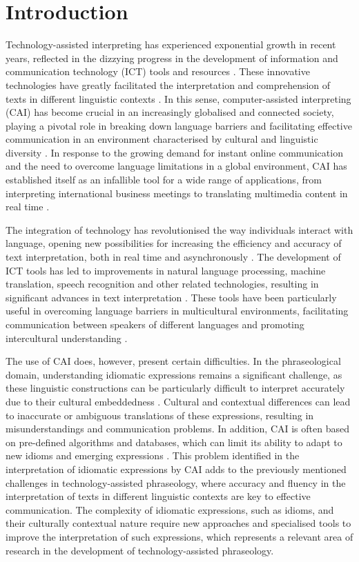 \section{Introduction}\label{sec-intro}

Technology-assisted interpreting has experienced exponential growth in
recent years, reflected in the dizzying progress in the development of
information and communication technology (ICT) tools and resources
\cite{gutierrezArtacho2016,mezcua2019}. These innovative
technologies have greatly facilitated the interpretation and
comprehension of texts in different linguistic contexts \cite{olallaSoler2015}. In this sense, computer-assisted interpreting (CAI)
has become crucial in an increasingly globalised and connected society,
playing a pivotal role in breaking down language barriers and
facilitating effective communication in an environment characterised by
cultural and linguistic diversity \cite{mellinger2019,li2021}. In
response to the growing demand for instant online communication and the
need to overcome language limitations in a global environment, CAI has
established itself as an infallible tool for a wide range of
applications, from interpreting international business meetings to
translating multimedia content in real time \cite{fantinuoli2017a,alcaidemartinez2021}.

The integration of technology has revolutionised the way individuals
interact with language, opening new possibilities for increasing the
efficiency and accuracy of text interpretation, both in real time and
asynchronously \cite{gaber2023a,ramirezRodriguez2023}. The development
of ICT tools has led to improvements in natural language processing,
machine translation, speech recognition and other related technologies,
resulting in significant advances in text interpretation \cite{valeroGarces2024}. These tools have been particularly useful in overcoming language
barriers in multicultural environments, facilitating communication
between speakers of different languages and promoting intercultural
understanding \cite{perez2020}.

The use of CAI does, however, present certain difficulties. In the
phraseological domain, understanding idiomatic expressions remains a
significant challenge, as these linguistic constructions can be
particularly difficult to interpret accurately due to their cultural
embeddedness \cite{corpaspastorgaber2021,ramirezRodriguez2022}.
Cultural and contextual differences can lead to inaccurate or ambiguous
translations of these expressions, resulting in misunderstandings and
communication problems. In addition, CAI is often based on pre-defined
algorithms and databases, which can limit its ability to adapt to new
idioms and emerging expressions \cite{ortigoza2024}. This problem
identified in the interpretation of idiomatic expressions by CAI adds to
the previously mentioned challenges in technology-assisted phraseology,
where accuracy and fluency in the interpretation of texts in different
linguistic contexts are key to effective communication. The complexity
of idiomatic expressions, such as idioms, and their culturally
contextual nature require new approaches and specialised tools to
improve the interpretation of such expressions, which represents a
relevant area of research in the development of technology-assisted
phraseology.
